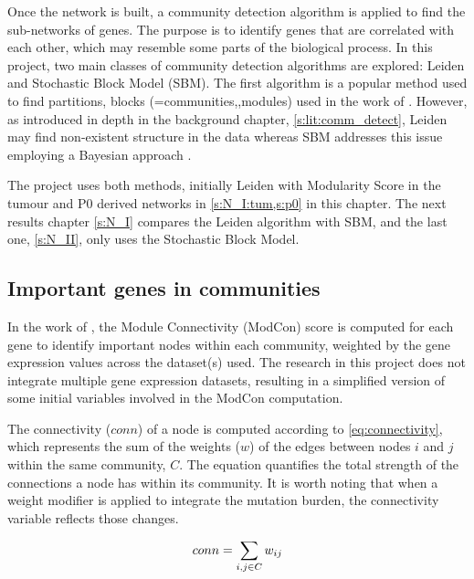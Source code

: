 Once the network is built, a community detection algorithm is applied to find the sub-networks of genes. The purpose is to identify genes that are correlated with each other, which may resemble some parts of the biological process. In this project, two main classes of community detection algorithms are explored: Leiden and Stochastic Block Model (SBM). The first algorithm is a popular method used to find partitions, blocks (=communities,,modules) used in the work of \citet{Care2019-ij}. However, as introduced in depth in the background chapter, \cref{s:lit:comm_detect}, Leiden may find non-existent structure in the data \citep{Peixoto2023-se} whereas SBM addresses this issue employing a Bayesian approach \citep{Peixoto2019-fg}. 

The project uses both methods, initially Leiden with Modularity Score in the tumour and P0 derived networks in \cref{s:N_I:tum,s:p0} in this chapter. The next results chapter \cref{s:N_I} compares the Leiden algorithm with SBM, and the last one, \cref{s:N_II}, only uses the Stochastic Block Model.


\subsection{Important genes in communities} \label{s:N_I:methods_modcon}

In the work of \citet{Care2019-ij}, the Module Connectivity (ModCon) score is computed for each gene to identify important nodes within each community, weighted by the gene expression values across the dataset(s) used. The research in this project does not integrate multiple gene expression datasets, resulting in a simplified version of some initial variables involved in the ModCon computation.

The connectivity ($conn$) of a node is computed according to \cref{eq:connectivity}, which represents the sum of the weights ($w$) of the edges between nodes $i$ and $j$ within the same community, $C$. The equation quantifies the total strength of the connections a node has within its community. It is worth noting that when a weight modifier is applied to integrate the mutation burden, the connectivity variable reflects those changes.

\begin{equation} \label{eq:connectivity}
    conn = \sum_{\substack{i, j \in C}} w_{ij} \\
\end{equation}

